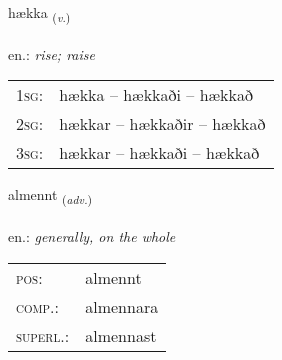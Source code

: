 \documentclass[frontgrid, backgrid]{flacards}\usepackage[]{graphicx}\usepackage[]{xcolor}
\begin{document}
\renewcommand{\blhead}{\vskip5pt {\small\bfseries\footnotesize Sagnorð | Verb }}
\renewcommand{\bcfoot}{\vskip5pt \hspace{2pt}{\small\bfseries\footnotesize 1K}}


{hækka \small{\textsubscript{(\textit{v.})}} \\[1ex] %
\textphonetic{[haihka]} \\
en.: \emph{rise; raise} \\  [2ex]
\renewcommand*{\arraystretch}{0.8}
\begin{tabular}{p{1cm}l}
\textsc{1sg}: & hækka -- hækkaði -- hækkað \\ 
\textsc{2sg}: & hækkar -- hækkaðir -- hækkað \\ 
\textsc{3sg}: & hækkar -- hækkaði -- hækkað \\ 
\end{tabular}
}

\renewcommand{\flhead}{\vskip5pt \fboxsep=0pt {\small\bfseries\footnotesize Atviksorð | Adverb}}
\renewcommand{\fcfoot}{\vskip5pt \fboxsep=0pt \hspace{2pt}{\small\bfseries\footnotesize 1K}}

\renewcommand{\blhead}{\vskip5pt {\small\bfseries\footnotesize Atviksorð | Adverb }}
\renewcommand{\bcfoot}{\vskip5pt \hspace{2pt}{\small\bfseries\footnotesize 1K}}


{almennt \small{\textsubscript{(\textit{adv.})}} \\[1ex] %
\textphonetic{[almɛn̥t]} \\
en.: \emph{generally, on the whole} \\  [2ex]
\renewcommand*{\arraystretch}{0.8}
\begin{tabular}{ll}
\textsc{pos}: & almennt \\ 
\textsc{comp.}: & almennara \\ 
\textsc{superl.}: & almennast \\
\end{tabular}
}
\end{document}
